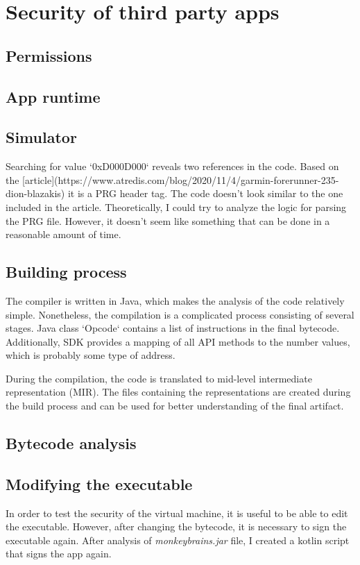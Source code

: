 
\section{Security of third party apps}

\subsection{Permissions}
\subsection{App runtime}
\subsection{Simulator}
Searching for value `0xD000D000` reveals two references in the code.
Based on the [article](https://www.atredis.com/blog/2020/11/4/garmin-forerunner-235-dion-blazakis) it is a PRG header tag.
The code doesn't look similar to the one included in the article.
Theoretically, I could try to analyze the logic for parsing the PRG file.
However, it doesn't seem like something that can be done in a reasonable amount of time.
\subsection{Building process}
The compiler is written in Java, which makes the analysis of the code relatively simple.
Nonetheless, the compilation is a complicated process consisting of several stages.
Java class `Opcode` contains a list of instructions in the final bytecode.
Additionally, SDK provides a mapping of all API methods to the number values, which is probably some type of address.

During the compilation, the code is translated to mid-level intermediate representation (MIR).
The files containing the representations are created during the build process and can be used for better understanding of the final artifact.
\subsection{Bytecode analysis}
\subsection{Modifying the executable}
In order to test the security of the virtual machine, it is useful to be able to edit the executable.
However, after changing the bytecode, it is necessary to sign the executable again.
After analysis of \textit{monkeybrains.jar} file, I created a kotlin script that signs the app again.
